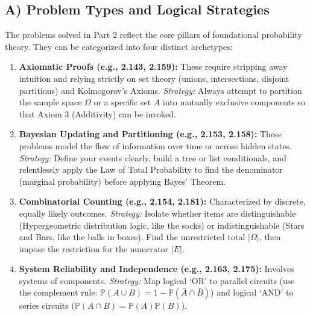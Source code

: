 \documentclass[11pt]{article}
\theoremstyle{definition}
\theoremstyle{remark}
\newcommand{\Prob}{\mathbb{P}}
\begin{document}
\subsection{A) Problem Types and Logical Strategies}
The problems solved in Part 2 reflect the core pillars of foundational probability theory. They can be categorized into four distinct archetypes:
\begin{enumerate}
    \item \textbf{Axiomatic Proofs (e.g., 2.143, 2.159):} These require stripping away intuition and relying strictly on set theory (unions, intersections, disjoint partitions) and Kolmogorov's Axioms. \textit{Strategy:} Always attempt to partition the sample space $\Omega$ or a specific set $A$ into mutually exclusive components so that Axiom 3 (Additivity) can be invoked.
    \item \textbf{Bayesian Updating and Partitioning (e.g., 2.153, 2.158):} These problems model the flow of information over time or across hidden states. \textit{Strategy:} Define your events clearly, build a tree or list conditionals, and relentlessly apply the Law of Total Probability to find the denominator (marginal probability) before applying Bayes' Theorem.
    \item \textbf{Combinatorial Counting (e.g., 2.154, 2.181):} Characterized by discrete, equally likely outcomes. \textit{Strategy:} Isolate whether items are distinguishable (Hypergeometric distribution logic, like the socks) or indistinguishable (Stars and Bars, like the balls in boxes). Find the unrestricted total $|\Omega|$, then impose the restriction for the numerator $|E|$.
    \item \textbf{System Reliability and Independence (e.g., 2.163, 2.175):} Involves systems of components. \textit{Strategy:} Map logical `OR' to parallel circuits (use the complement rule: $\Prob(A \cup B) = 1 - \Prob(\bar{A}\cap\bar{B})$) and logical `AND' to series circuits ($\Prob(A \cap B) = \Prob(A)\Prob(B)$). 
\end{enumerate}
\end{document}
